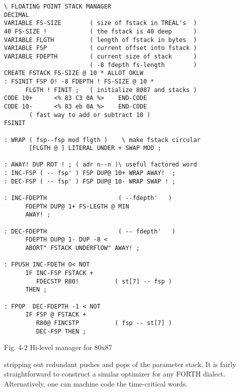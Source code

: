 \begin{lstlisting}[frame=single, float]
\ FLOATING POINT STACK MANAGER
DECIMAL
VARIABLE FS-SIZE        ( size of fstack in TREAL's  ) 
40 FS-SIZE !            ( the fstack is 40 deep      )
VARIABLE FLGTH          ( length of fstack in bytes  )
VARIABLE FSP            ( current offset into fstack )
VARIABLE FDEPTH         ( current size of stack      )
                        ( -8 fdepth fs-length        )
CREATE FSTACK FS-SIZE @ 10 * ALLOT OKLW
: FSINIT FSP O! -8 FDEPTH ! FS-SIZE @ 10 *
      FLGTH ! FINIT ;   ( initialize 8087 and stacks )
CODE 10+      <% 83 C3 0A %>    END-CODE
CODE 10-      <% 83 eb 0A %>    END-CODE
       ( fast way to add or subtract 10 )
FSINIT

: WRAP ( fsp--fsp mod flgth )    \ make fstack circular
       [FLGTH @ ] LITERAL UNDER + SWAP MOD ;

: AWAY! DUP ROT ! ; ( adr n--n )\ useful factored word
: INC-FSP ( -- fsp' ) FSP DUP@ 10+ WRAP AWAY!  ;
: DEC-FSP ( -- fsp' ) FSP DUP@ 10- WRAP SWAP ! ;

: INC-FDEPTH                    ( --fdepth'   )
      FDEPTH DUP@ 1+ FS-LEGTH @ MIN
      AWAY! ;

: DEC-FDEPTH                    ( -- fdepth'   )
      FDEPTH DUP@ 1- DUP -8 <
      ABORT" FSTACK UNDERFlOW" AWAY! ;

: FPUSH INC-FDETH O< NOT
      IF INC-FSP FSTACK +
         FDECSTP R80!          ( st[7] -- fsp )
      THEN ;

: FPOP  DEC-FDEPTH -1 < NOT
      IF FSP @ FSTACK +
         R80@ FINCSTP          ( fsp -- st[7] )
         DEC-FSP THEN ;
\end{lstlisting}
Fig. 4-2 Hi-level manager for 80x87

stripping out redundant pushes and pops of the parameter stack. It is fairly straightforward to construct a similar optimizer for any FORTH dialect. Alternatively, one can machine code the time-critical words.


